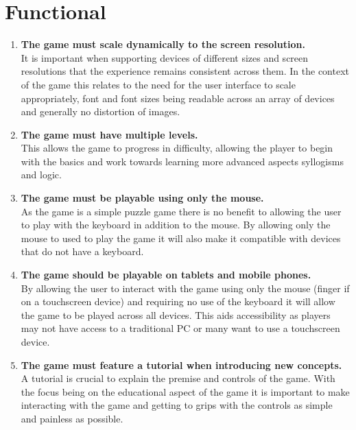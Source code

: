 \documentclass[12pt,a4paper]{report}
\begin{document}
 \section{Functional}
   \begin{enumerate}[label*=\arabic*]
   
   
   
   
            \item \textbf{The game must scale dynamically to the screen resolution.}\\
It is important when supporting devices of different sizes and screen resolutions that the experience remains consistent across them. In the context of the game this relates to the need for the user interface to scale appropriately, font and font sizes being readable across an array of devices and generally no distortion of images.

            \item \textbf{The game must have multiple levels.}\\
This allows the game to progress in difficulty, allowing the player to begin with the basics and work towards learning more advanced aspects syllogisms and logic.

            \item \textbf{The game must be playable using only the mouse.}\\
As the game is a simple puzzle game there is no benefit to allowing the user to play with the keyboard in addition to the mouse. By allowing only the mouse to used to play the game it will also make it compatible with devices that do not have a keyboard.

 \item \textbf{The game should be playable on tablets and mobile phones.}\\
By allowing the user to interact with the game using only the mouse (finger if on a touchscreen device) and requiring no use of the keyboard it will allow the game to be played across all devices. This aids accessibility as players may not have access to a traditional PC or many want to use a touchscreen device.	


 \item \textbf{The game must feature a tutorial when introducing new concepts.}\\
A tutorial is crucial to explain the premise and controls of the game. With the focus being on the educational aspect of the game it is important to make interacting with the game and getting to grips with the controls as simple and painless as possible.
	 

\end{enumerate}
\end{document}
